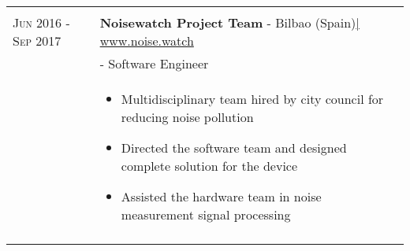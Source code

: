 \documentclass[a4paper,10pt]{article}
\begin{document}
\begin{tabular}{p{3.2cm}p{13.1cm}}
{\begin{itemize}[noitemsep,topsep=3pt]
 \end{itemize}} \vspace{-0.09in} \\ 

 \textsc{Jun 2016 - Sep 2017}& \textbf{Noisewatch Project Team} - Bilbao (Spain)\href{http://noise.watch}{\hfill | \footnotesize www.noise.watch}\\
 & - Software Engineer \\
 & \footnotesize{ \begin{itemize}[noitemsep,topsep=3pt]
 \vspace{-0.1in}
 \item Multidisciplinary team hired by city council for reducing noise pollution
 \item Directed the software team and designed complete solution for the device
 \item Assisted the hardware team in noise measurement signal processing
 \end{itemize}} \\

\vspace{-.2in}
\end{tabular}

 \vspace{-.3in}

\end{document}

